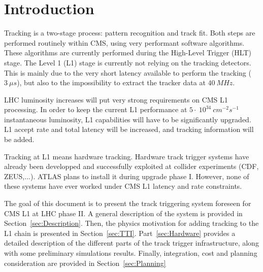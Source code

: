 \section{Introduction}

\noindent Tracking is a two-stage process: pattern recognition and track fit. Both steps are performed routinely within CMS, using very performant software algorithms. These algorithms are currently performed during the High-Level Trigger (HLT) stage. The Level 1 (L1) stage is currently not relying on the tracking detectors. This is mainly due to the very short latency available to perform the tracking ($3~\mu s$), but also to the impossibility to extract the tracker data at $40~MHz$.

\noindent LHC luminosity increases will put very strong requirements on CMS L1 processing. In order to keep the current L1 performance at $5\cdot~10^{34}~cm^{-2}s^{-1}$ instantaneous luminosity, L1 capabilities will have to be significantly upgraded. L1 accept rate and total latency will be increased, and tracking information will be added.

\noindent Tracking at L1 means hardware tracking. Hardware track trigger systems have already been developped and successfully exploited at collider experiments (CDF, ZEUS,...). ATLAS plans to install it during upgrade phase I. However, none of these systems have ever worked under CMS L1 latency and rate constraints.  

\noindent The goal of this document is to present the track triggering system foreseen for CMS L1 at LHC phase II. A general description of the system is provided in Section~\ref{sec:Description}. Then, the physics motivation for adding tracking to the L1 chain is presented in Section~\ref{sec:TTI}. Part~\ref{sec:Hardware} provides a detailed description of the different parts of the track trigger infrastructure, along with some preliminary simulations results. Finally, integration, cost and planning consideration are provided in Section~\ref{sec:Planning} 

\clearpage
